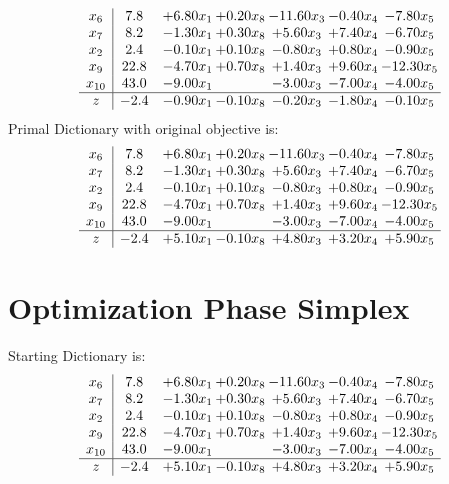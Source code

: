 \documentclass[9pt]{article}
\begin{document}
\[\begin{array}{c| c c@{\hskip 2pt} c@{\hskip 2pt} c@{\hskip 2pt} c@{\hskip 2pt} c@{\hskip 2pt} }
 x_{6}   &  7.8 & +  6.80 x_{1} & +  0.20 x_{8} & -11.60 x_{3} & -0.40 x_{4} & -7.80 x_{5}\\
 x_{7}   &  8.2 & -1.30 x_{1} & +  0.30 x_{8} & +  5.60 x_{3} & +  7.40 x_{4} & -6.70 x_{5}\\
 x_{2}   &  2.4 & -0.10 x_{1} & +  0.10 x_{8} & -0.80 x_{3} & +  0.80 x_{4} & -0.90 x_{5}\\
 x_{9}   &  22.8 & -4.70 x_{1} & +  0.70 x_{8} & +  1.40 x_{3} & +  9.60 x_{4} & -12.30 x_{5}\\
 x_{10}   &  43.0 & -9.00 x_{1} &   & -3.00 x_{3} & -7.00 x_{4} & -4.00 x_{5}\\
\hline
z    &  -2.4 & -0.90 x_{1} & -0.10 x_{8} & -0.20 x_{3} & -1.80 x_{4} & -0.10 x_{5}\\
\end{array}\]
Primal Dictionary with original objective is:
\[\begin{array}{c| c c@{\hskip 2pt} c@{\hskip 2pt} c@{\hskip 2pt} c@{\hskip 2pt} c@{\hskip 2pt} }
 x_{6}   &  7.8 & +  6.80 x_{1} & +  0.20 x_{8} & -11.60 x_{3} & -0.40 x_{4} & -7.80 x_{5}\\
 x_{7}   &  8.2 & -1.30 x_{1} & +  0.30 x_{8} & +  5.60 x_{3} & +  7.40 x_{4} & -6.70 x_{5}\\
 x_{2}   &  2.4 & -0.10 x_{1} & +  0.10 x_{8} & -0.80 x_{3} & +  0.80 x_{4} & -0.90 x_{5}\\
 x_{9}   &  22.8 & -4.70 x_{1} & +  0.70 x_{8} & +  1.40 x_{3} & +  9.60 x_{4} & -12.30 x_{5}\\
 x_{10}   &  43.0 & -9.00 x_{1} &   & -3.00 x_{3} & -7.00 x_{4} & -4.00 x_{5}\\
\hline
z    &  -2.4 & +  5.10 x_{1} & -0.10 x_{8} & +  4.80 x_{3} & +  3.20 x_{4} & +  5.90 x_{5}\\
\end{array}\]
\section{Optimization Phase Simplex}
Starting Dictionary is:
\[\begin{array}{c| c c@{\hskip 2pt} c@{\hskip 2pt} c@{\hskip 2pt} c@{\hskip 2pt} c@{\hskip 2pt} }
 x_{6}   &  7.8 & +  6.80 x_{1} & +  0.20 x_{8} & -11.60 x_{3} & -0.40 x_{4} & -7.80 x_{5}\\
 x_{7}   &  8.2 & -1.30 x_{1} & +  0.30 x_{8} & +  5.60 x_{3} & +  7.40 x_{4} & -6.70 x_{5}\\
 x_{2}   &  2.4 & -0.10 x_{1} & +  0.10 x_{8} & -0.80 x_{3} & +  0.80 x_{4} & -0.90 x_{5}\\
 x_{9}   &  22.8 & -4.70 x_{1} & +  0.70 x_{8} & +  1.40 x_{3} & +  9.60 x_{4} & -12.30 x_{5}\\
 x_{10}   &  43.0 & -9.00 x_{1} &   & -3.00 x_{3} & -7.00 x_{4} & -4.00 x_{5}\\
\hline
z    &  -2.4 & +  5.10 x_{1} & -0.10 x_{8} & +  4.80 x_{3} & +  3.20 x_{4} & +  5.90 x_{5}\\
\end{array}\]
\end{document}
